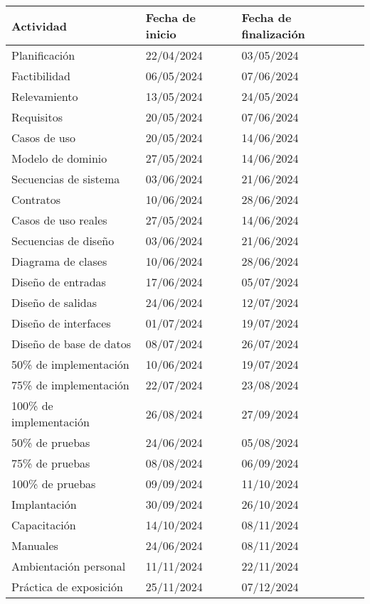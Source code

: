 \begin{center}
\begin{longtable}{
	| p{5.3cm} | p{5.3cm} | p{5.3cm} |
}
	\hline
	\rowcolor{lightgray}
	\hfil \textbf{Actividad} &
	\hfil \textbf{Fecha de inicio} &
	\hfil \textbf{Fecha de finalizaci\'on}
	\\
	\hline
	\endhead
	Planificaci\'on &
	22/04/2024 & 03/05/2024 \\
	\hline
	Factibilidad &
	06/05/2024 & 07/06/2024 \\
	\hline
	Relevamiento &
	13/05/2024 & 24/05/2024 \\
	\hline
	Requisitos &
	20/05/2024 & 07/06/2024 \\
	\hline
	Casos de uso &
	20/05/2024 & 14/06/2024 \\
	\hline
	Modelo de dominio &
	27/05/2024 & 14/06/2024 \\
	\hline
	Secuencias de sistema &
	03/06/2024 & 21/06/2024 \\
	\hline
	Contratos &
	10/06/2024 & 28/06/2024 \\
	\hline
	Casos de uso reales &
	27/05/2024 & 14/06/2024 \\
	\hline
	Secuencias de dise\~no &
	03/06/2024 & 21/06/2024 \\
	\hline
	Diagrama de clases &
	10/06/2024 & 28/06/2024 \\
	\hline
	Dise\~no de entradas &
	17/06/2024 & 05/07/2024 \\
	\hline
	Dise\~no de salidas &
	24/06/2024 & 12/07/2024 \\
	\hline
	Dise\~no de interfaces &
	01/07/2024 & 19/07/2024 \\
	\hline
	Dise\~no de base de datos &
	08/07/2024 & 26/07/2024 \\
	\hline
	50\% de implementaci\'on &
	10/06/2024 & 19/07/2024 \\
	\hline
	75\% de implementaci\'on &
	22/07/2024 & 23/08/2024 \\
	\hline
	100\% de implementaci\'on &
	26/08/2024 & 27/09/2024 \\
	\hline
	50\% de pruebas &
	24/06/2024 & 05/08/2024 \\
	\hline
	75\% de pruebas &
	08/08/2024 & 06/09/2024 \\
	\hline
	100\% de pruebas &
	09/09/2024 & 11/10/2024 \\
	\hline
	Implantaci\'on &
	30/09/2024 & 26/10/2024 \\
	\hline
	Capacitaci\'on &
	14/10/2024 & 08/11/2024 \\
	\hline
	Manuales &
	24/06/2024 & 08/11/2024 \\
	\hline
	Ambientaci\'on personal &
	11/11/2024 & 22/11/2024 \\
	\hline
	Pr\'actica de exposici\'on &
	25/11/2024 & 07/12/2024 \\
	\hline
\end{longtable}
\end{center}
